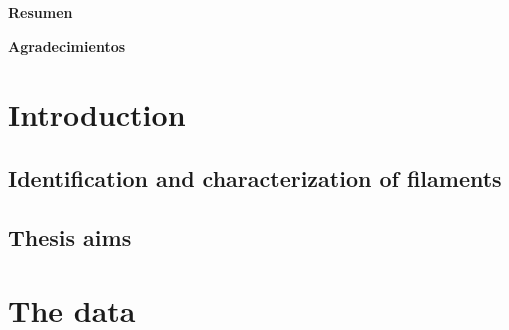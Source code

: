 \documentclass[phd, titlesmallcaps, copyrightpage]{mqthesis}
\numberwithin{equation}{chapter}
\begin{document}
\newpage

\thispagestyle{empty}
{\Huge \bf \vspace*{5 ex} Resumen}

\vspace*{8 ex}%

\newpage

\thispagestyle{empty}
{\Huge \bf \vspace*{5 ex} Agradecimientos}
\vspace*{8 ex}%
%
\newpage

\tableofcontents
\listoffigures
\listoftables

\chapter{Introduction}






 


\newpage
\section{Identification and characterization of filaments}





%
%
%
\label{sec:mass}



\newpage
\section{Thesis aims}



\chapter{The data}\label{observations}
%

\end{document}
